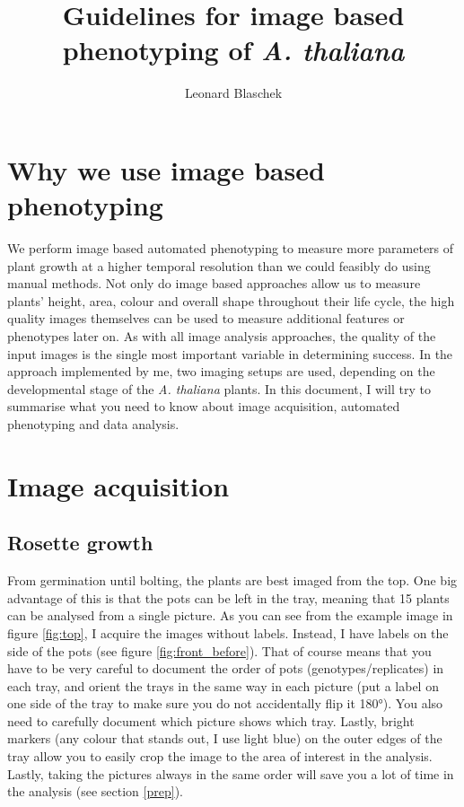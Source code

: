 \documentclass[10pt]{article}
\title{Guidelines for image based phenotyping of \textit{A. thaliana}}
\author{Leonard Blaschek}
\begin{document}
 	\maketitle
 	
 	\section*{Why we use image based phenotyping}
 	
	We perform image based automated phenotyping to measure more parameters of plant growth at a higher temporal resolution than we could feasibly do using manual methods. Not only do image based approaches allow us to measure plants' height, area, colour and overall shape throughout their life cycle, the high quality images themselves can be used to measure additional features or phenotypes later on. As with all image analysis approaches, the quality of the input images is the single most important variable in determining success. In the approach implemented by me, two imaging setups are used, depending on the developmental stage of the \textit{A. thaliana} plants. In this document, I will try to summarise what you need to know about image acquisition, automated phenotyping and data analysis.
	
	\tableofcontents
	
	
	\section{Image acquisition}

 	\subsection{Rosette growth}
 	
 	From germination until bolting, the plants are best imaged from the top. One big advantage of this is that the pots can be left in the tray, meaning that 15 plants can be analysed from a single picture. As you can see from the example image in figure \ref{fig:top}, I acquire the images without labels. Instead, I have labels on the side of the pots (see figure \ref{fig:front_before}). That of course means that you have to be very careful to document the order of pots (genotypes/replicates) in each tray, and orient the trays in the same way in each picture (put a label on one side of the tray to make sure you do not accidentally flip it 180°). You also need to carefully document which picture shows which tray. Lastly, bright markers (any colour that stands out, I use light blue) on the outer edges of the tray allow you to easily crop the image to the area of interest in the analysis. Lastly, taking the pictures always in the same order will save you a lot of time in the analysis (see section \ref{prep}).
 		
\end{document}
